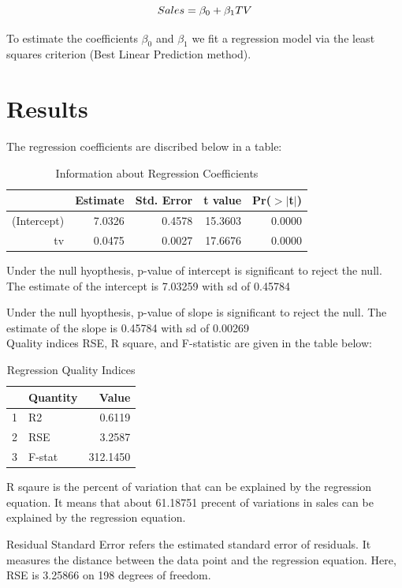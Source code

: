 \documentclass{article}
\begin{document}
$$\\Sales = \beta_{0} + \beta_{1}TV$$ 

To estimate the coefficients $\beta_{0}$ and $\beta_{1}$ we fit a regression model via the least squares criterion (Best Linear Prediction method).

\section{Results}
The regression coefficients are discribed below in a table:

\begin{table}[ht]
\centering
\begin{tabular}{rrrrr}
  \hline
 & Estimate & Std. Error & t value & Pr($>$$|$t$|$) \\ 
  \hline
(Intercept) & 7.0326 & 0.4578 & 15.3603 & 0.0000 \\ 
  tv & 0.0475 & 0.0027 & 17.6676 & 0.0000 \\ 
   \hline
\end{tabular}
\caption{Information about Regression Coefficients} 
\end{table}   
Under the null hyopthesis, p-value of intercept is significant to reject the null. The estimate of the   intercept is 7.03259 with sd of 0.45784

Under the null hyopthesis, p-value of slope is significant to reject the null. The estimate of the slope is 0.45784 with sd of 0.00269\\

Quality indices RSE, R square, and F-statistic are given in the table below: 

\begin{table}[ht]
\centering
\begin{tabular}{rlr}
  \hline
 & Quantity & Value \\ 
  \hline
1 & R2 & 0.6119 \\ 
  2 & RSE & 3.2587 \\ 
  3 & F-stat & 312.1450 \\ 
   \hline
\end{tabular}
\caption{Regression Quality Indices} 
\end{table}

R sqaure is the percent of variation that can be explained by the regression equation. It means that about 61.18751 precent of variations in sales can be explained by the regression equation.

Residual Standard Error refers the estimated standard error of residuals. It measures the distance between the data point and the regression equation. Here, RSE is 3.25866 on 198 degrees of freedom.
\end{document}
